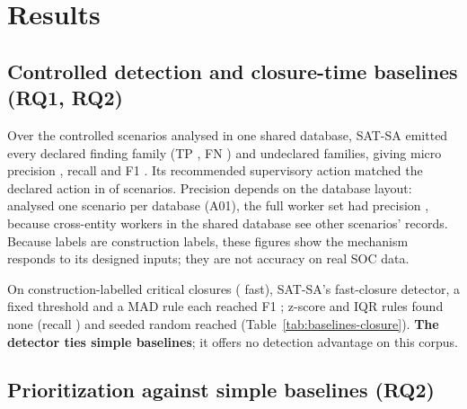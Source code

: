 \section{Results}
\label{sec:results}

\subsection{Controlled detection and closure-time baselines (RQ1, RQ2)}

Over the  controlled scenarios analysed in one shared database,
SAT-SA emitted every declared finding family (TP , FN ) and
 undeclared families, giving micro precision , recall
 and F1 . Its recommended supervisory action matched the
declared action in  of  scenarios. Precision
depends on the database layout: analysed one scenario per database (A01), the full
worker set had precision , because cross-entity workers in the
shared database see other scenarios' records. Because labels are construction
labels, these figures show the mechanism responds to its designed inputs; they
are not accuracy on real SOC data.

On  construction-labelled critical closures
( fast), SAT-SA's fast-closure detector, a fixed threshold and a
MAD rule each reached F1 ; z-score and IQR rules found none
(recall ) and seeded random reached
 (Table~\ref{tab:baselines-closure}). \textbf{The detector
ties simple baselines}; it offers no detection advantage on this corpus.



\subsection{Prioritization against simple baselines (RQ2)}

